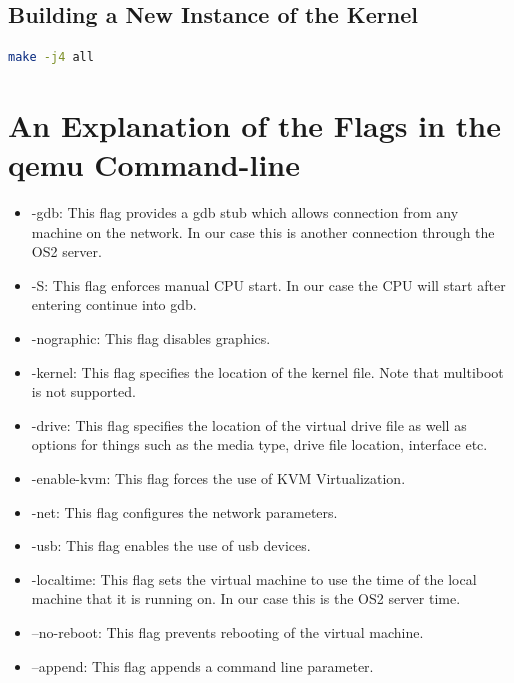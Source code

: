 \documentclass[letterpaper, onecolumn, draftclsnofoot, 10pt, compsoc]{IEEEtran}
\begin{document}
    \subsection{Building a New Instance of the Kernel}
    \begin{lstlisting}[language=bash]
    make -j4 all
    \end{lstlisting}

\newpage
\section{An Explanation of the Flags in the qemu Command-line}
    \begin{singlespace}
        \begin{itemize}
            \item -gdb: This flag provides a gdb stub which allows connection from any machine on the network. In our case this is another connection through the OS2 server.
            \item -S: This flag enforces manual CPU start. In our case the CPU will start after entering continue into gdb.
            \item -nographic: This flag disables graphics.
            \item -kernel: This flag specifies the location of the kernel file. Note that multiboot is not supported.
            \item -drive: This flag specifies the location of the virtual drive file as well as options for things such as the media type, drive file location, interface etc.
            \item -enable-kvm: This flag forces the use of KVM Virtualization.
            \item -net: This flag configures the network parameters.
            \item -usb: This flag enables the use of usb devices.
            \item -localtime: This flag sets the virtual machine to use the time of the local machine that it is running on. In our case this is the OS2 server time.
            \item --no-reboot: This flag prevents rebooting of the virtual machine.
            \item --append: This flag appends a command line parameter.
        \end{itemize}
    \end{singlespace}
\end{document}
